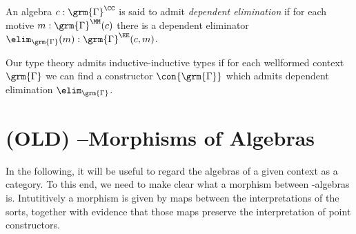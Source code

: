 \begin{defn}
An algebra $c : \grm{\Gamma}^\CC$ is said to admit \emph{dependent elimination}
if for each motive $m : \grm{\Gamma}^\MM(c)$ there is a dependent eliminator
$\elim_{\grm{\Gamma}}(m) : \grm{\Gamma}^\EE(c, m)$.
\end{defn}

\begin{thm}
Our type theory admits inductive-inductive types if for each wellformed context
$\grm{\Gamma}$ we can find a constructor $\con{\grm{\Gamma}}$ which admits dependent
elimination $\elim_{\grm{\Gamma}}$.
\end{thm}

\section{(OLD) --Morphisms of Algebras}

In the following, it will be useful to regard the algebras of a given context
\grm{\Gamma} as a category.
To this end, we need to make clear what a morphism between \grm{\Gamma}-algebras
is.
Intutitively a morphism is given by maps between the interpretations of the sorts,
together with evidence that those maps preserve the interpretation of point
constructors.

